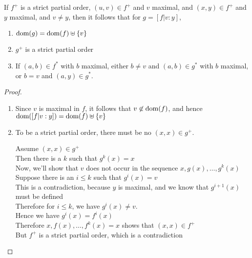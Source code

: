 \begin{lemma}
If $f^+$ is a strict partial order, $(u, v) \in f^+$ and $v$ maximal,
and $(x, y) \in f^+$ and $y$ maximal, and $v \not= y$, then it follows that for $g = [f|v:y]$,

\begin{enumerate}
\item $\mbox{dom}({g}) = \mbox{dom}({f}) \uplus \{{v}\}$
\item $g^+$ is a strict partial order 
\item If $(a,b) \in f^*$ with $b$ maximal, either $b \not= v$ and $(a,b) \in g^*$ with $b$ maximal,
  or $b = v$ and $(a,y) \in g^*$. 
\end{enumerate}
\end{lemma}

\begin{proof}
\begin{enumerate}
\item Since $v$ is maximal in $f$, it follows that $v \not\in \mbox{dom}({f})$, and hence $\mbox{dom}({[f|v:y]}) = \mbox{dom}({f}) \uplus \{{v}\}$

\item To be a strict partial order, there must be no $(x,x) \in g^+$. 
\begin{tabbedproof}
\oo Assume $(x, x) \in g^+$ \\
\oo Then there is a $k$ such that $g^k(x) = x$ \\
\oo Now, we'll show that $v$ does not occur in the sequence $x, g(x), \ldots, g^k(x)$ \\
\ooo Suppose there is an $i \leq k$ such that $g^i(x) = v$ \\
\ooo This is a contradiction, because $y$ is maximal, and we know that $g^{i+1}(x)$ must be defined \\
\oo Therefore for $i \leq k$, we have $g^i(x) \not= v$.  \\
\oo Hence we have $g^i(x) = f^i(x)$ \\
\oo Therefore $x, f(x), \ldots, f^k(x) = x$ shows that $(x, x) \in f^+$ \\
\oo But $f^+$ is a strict partial order, which is a contradiction \\
\end{tabbedproof}


\end{enumerate}
\end{proof}
